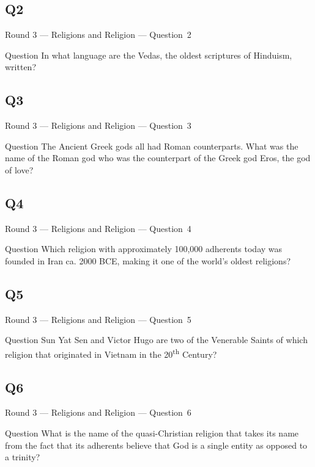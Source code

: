 \documentclass[11pt]{beamer}
\begin{document}
\subsection*{Q2}
\begin{frame}[t]{Round 3 --- Religions and Religion --- \mbox{Question 2}}
\vspace{-0.5em}
\begin{block}{Question}
In what language are the Vedas, the oldest scriptures of Hinduism, written?
\end{block}
\end{frame}
\subsection*{Q3}
\begin{frame}[t]{Round 3 --- Religions and Religion --- \mbox{Question 3}}
\vspace{-0.5em}
\begin{block}{Question}
The Ancient Greek gods all had Roman counterparts. What was the name of the Roman god who was the counterpart of the Greek god Eros, the god of love?
\end{block}
\end{frame}
\subsection*{Q4}
\begin{frame}[t]{Round 3 --- Religions and Religion --- \mbox{Question 4}}
\vspace{-0.5em}
\begin{block}{Question}
Which religion with approximately 100,000 adherents today was founded in Iran ca. 2000 BCE, making it one of the world's oldest religions?
\end{block}
\end{frame}
\subsection*{Q5}
\begin{frame}[t]{Round 3 --- Religions and Religion --- \mbox{Question 5}}
\vspace{-0.5em}
\begin{block}{Question}
Sun Yat Sen and Victor Hugo are two of the Venerable Saints of which religion that originated in Vietnam in the 20\textsuperscript{th} Century?
\end{block}
\end{frame}
\subsection*{Q6}
\begin{frame}[t]{Round 3 --- Religions and Religion --- \mbox{Question 6}}
\vspace{-0.5em}
\begin{block}{Question}
What is the name of the quasi-Christian religion that takes its name from the fact that its adherents believe that God is a single entity as opposed to a trinity?
\end{block}
\end{frame}
\end{document}
